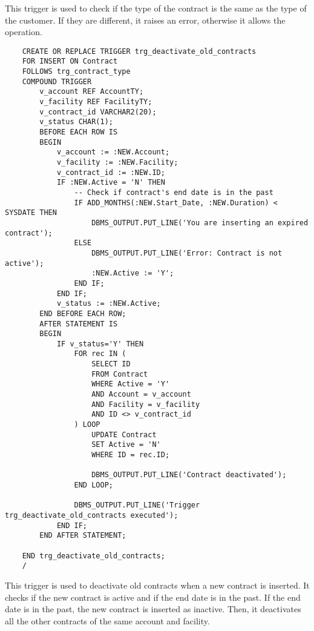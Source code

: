 This trigger is used to check if the type of the contract is the same as the type of the customer. If they are different, it raises an error, otherwise it allows the operation.


\begin{lstlisting}
    CREATE OR REPLACE TRIGGER trg_deactivate_old_contracts
    FOR INSERT ON Contract
    FOLLOWS trg_contract_type
    COMPOUND TRIGGER
        v_account REF AccountTY;
        v_facility REF FacilityTY;
        v_contract_id VARCHAR2(20); 
        v_status CHAR(1);
        BEFORE EACH ROW IS
        BEGIN
            v_account := :NEW.Account;
            v_facility := :NEW.Facility;
            v_contract_id := :NEW.ID;
            IF :NEW.Active = 'N' THEN
                -- Check if contract's end date is in the past
                IF ADD_MONTHS(:NEW.Start_Date, :NEW.Duration) < SYSDATE THEN
                    DBMS_OUTPUT.PUT_LINE('You are inserting an expired contract');
                ELSE
                    DBMS_OUTPUT.PUT_LINE('Error: Contract is not active');
                    :NEW.Active := 'Y';
                END IF;
            END IF;
            v_status := :NEW.Active;
        END BEFORE EACH ROW;
        AFTER STATEMENT IS
        BEGIN
            IF v_status='Y' THEN
                FOR rec IN (
                    SELECT ID
                    FROM Contract
                    WHERE Active = 'Y'
                    AND Account = v_account
                    AND Facility = v_facility
                    AND ID <> v_contract_id
                ) LOOP
                    UPDATE Contract
                    SET Active = 'N'
                    WHERE ID = rec.ID;
    
                    DBMS_OUTPUT.PUT_LINE('Contract deactivated');
                END LOOP;
    
                DBMS_OUTPUT.PUT_LINE('Trigger trg_deactivate_old_contracts executed');
            END IF;
        END AFTER STATEMENT;
    
    END trg_deactivate_old_contracts;
    /
\end{lstlisting}

This trigger is used to deactivate old contracts when a new contract is inserted. It checks if the new contract is active and if the end date is in the past. If the end date is in the past, the new contract is inserted as inactive. Then, it deactivates all the other contracts of the same account and facility.


